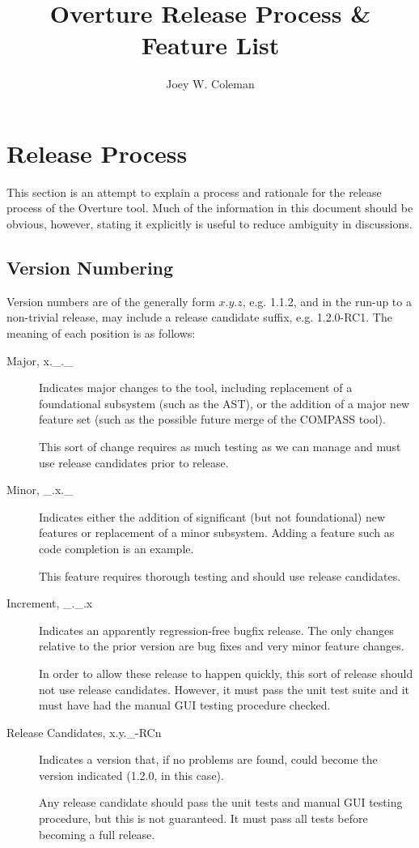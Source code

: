 \documentclass{overturerep}
\title{Overture Release Process \& Feature List}
\author{Joey W. Coleman}
\begin{document}
\maketitle
\tableofcontents



\chapter{Release Process}

  This section is an attempt to explain a process and rationale for
  the release process of the Overture tool.  Much of the information
  in this document should be obvious, however, stating it explicitly
  is useful to reduce ambiguity in discussions.

\section{Version Numbering}

  Version numbers are of the generally form $x.y.z$, e.g. 1.1.2, and
  in the run-up to a non-trivial release, may include a release
  candidate suffix, e.g. 1.2.0-RC1.  The meaning of each position is
  as follows:

\begin{description}
\item[Major, x.\_.\_] Indicates major changes to the tool, including
  replacement of a foundational subsystem (such as the AST), or the
  addition of a major new feature set (such as the possible future
  merge of the COMPASS tool).

  This sort of change requires as much testing as we can manage and
  must use release candidates prior to release.

\item[Minor, \_.x.\_] Indicates either the addition of significant
  (but not foundational) new features or replacement of a minor
  subsystem.  Adding a feature such as code completion is an example.

  This feature requires thorough testing and should use release
  candidates.

\item[Increment, \_.\_.x] Indicates an apparently regression-free bugfix
  release.  The only changes relative to the prior version are bug
  fixes and very minor feature changes.

  In order to allow these release to happen quickly, this sort of
  release should not use release candidates.  However, it must pass
  the unit test suite and it must have had the manual GUI testing
  procedure checked.

\item[Release Candidates, x.y.\_-RCn] Indicates a version that, if no
  problems are found, could become the version indicated (1.2.0, in
  this case).

  Any release candidate should pass the unit tests and manual GUI
  testing procedure, but this is not guaranteed.  It must pass all
  tests before becoming a full release.
\end{description}
\end{document}
